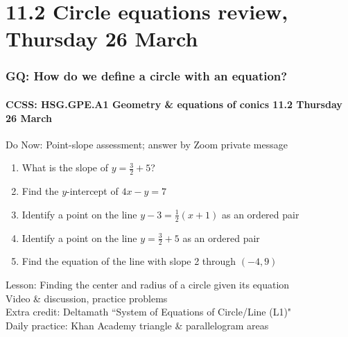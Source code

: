 \documentclass{beamer}
\begin{document}
\section{11.2 Circle equations review, Thursday 26 March} 
\frame
{
  \frametitle{GQ: How do we define a circle with an equation?}
  \framesubtitle{CCSS: HSG.GPE.A1 Geometry \& equations of conics \hfill \alert{11.2 Thursday 26 March}}

  \begin{block}{Do Now: Point-slope assessment; answer by Zoom private message}
    \begin{enumerate}
      \item What is the slope of $y=\frac{3}{2}+5$?
      \item Find the $y$-intercept of $4x-y=7$
      \item Identify a point on the line $y-3=\frac{1}{2}(x+1)$ as an ordered pair
      \item Identify a point on the line $y=\frac{3}{2}+5$ as an ordered pair
      \item Find the equation of the line with slope 2 through $(-4,9)$
    \end{enumerate}

    \end{block}
    Lesson: Finding the center and radius of a circle given its equation \\
    Video \& discussion, practice problems  \\
    Extra credit: Deltamath ``System of Equations of Circle/Line (L1)" \\[0.25cm]
    Daily practice: Khan Academy triangle \& parallelogram areas
}
\end{document}

